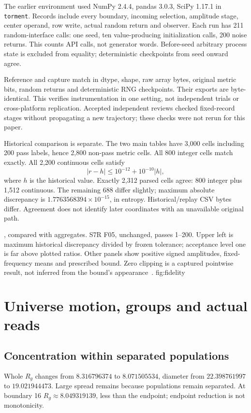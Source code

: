 The earlier environment used NumPy 2.4.4, pandas 3.0.3, SciPy 1.17.1 in \texttt{torment}. Records include every boundary, incoming selection, amplitude stage, center operand, row write, actual random return and observer. Each run has 211 random-interface calls: one seed, ten value-producing initialization calls, 200 noise returns. This counts API calls, not generator words. Before-seed arbitrary process state is excluded from equality; deterministic checkpoints from seed onward agree.

Reference and capture match in dtype, shape, raw array bytes, original metric bits, random returns and deterministic RNG checkpoints. Their exports are byte-identical. This verifies instrumentation in one setting, not independent trials or cross-platform replication. Accepted independent reviews checked fixed-record stages without propagating a new trajectory; these checks were not rerun for this paper.

Historical comparison is separate. The two main tables have 3,000 cells including 200 pass labels, hence 2,800 non-pass metric cells. All 800 integer cells match exactly. All 2,200 continuous cells satisfy
\begin{equation}\label{eq:tolerance}
|r-h|\le10^{-12}+10^{-10}|h|,
\end{equation}
where \(h\) is the historical value. Exactly 2,312 parsed cells agree: 800 integer plus 1,512 continuous. The remaining 688 differ slightly; maximum absolute discrepancy is \(1.7763568394\times10^{-15}\), in entropy. Historical/replay CSV bytes differ. Agreement does not identify later coordinates with an unavailable original path.

{, compared with  aggregates. S7R F05, unchanged, passes 1--200. Upper left is maximum historical discrepancy divided by frozen tolerance; acceptance level one is far above plotted ratios. Other panels show positive signed amplitudes, fixed-frequency means and prescribed bound. Zero clipping is a captured pointwise result, not inferred from the bound's appearance~\citep{s7rprovenance,s7rreview}.}
{fig:fidelity}

\section{Universe motion, groups and actual reads}\label{sec:umotion}
\subsection{Concentration within separated populations}
Whole \(R_g\) changes from \(8.316796374\) to \(8.071505534\), diameter from \(22.398761997\) to \(19.021944473\). Large spread remains because populations remain separated. At boundary 16 \(R_g\approx8.049319139\), less than the endpoint; endpoint reduction is not monotonicity.


